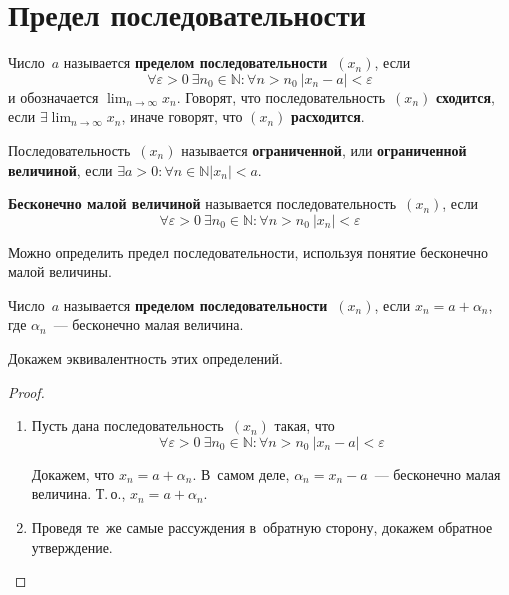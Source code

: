 \section{Предел последовательности}
  Число~$a$ называется \textbf{пределом последовательности~$(x_n)$}, если
\begin{equation*}
\forall \varepsilon > 0 \ \exists n_0 \in \mathbb N \colon \forall n > n_0 \ |x_n - a| < \varepsilon
\end{equation*}
и обозначается $\displaystyle \lim_{n \to \infty} x_n$.
Говорят, что последовательность~$(x_n)$ \textbf{сходится}, если $\displaystyle \exists\lim_{n \to \infty} x_n$, иначе говорят, что $(x_n)$ \textbf{расходится}.

Последовательность~$(x_n)$ называется \textbf{ограниченной}, или \textbf{ограниченной величиной}, если
$\exists a > 0 \colon \forall n \in \mathbb N \allowbreak |x_n| < a$.

 \textbf{Бесконечно малой величиной} называется последовательность~$(x_n)$, если
\begin{equation*}
\forall \varepsilon > 0 \ \exists n_0 \in \mathbb N \colon \forall n > n_0 \ |x_n| < \varepsilon
\end{equation*}

Можно определить предел последовательности, используя понятие бесконечно малой величины.

Число~$a$ называется \textbf{пределом последовательности~$(x_n)$}, если $x_n = a + \alpha_n$, где $\alpha_n$~--- бесконечно малая величина.

Докажем эквивалентность этих определений.
\begin{proof}
\begin{enumerate}
	\item Пусть дана последовательность~$(x_n)$ такая, что
	\begin{equation*}
	\forall \varepsilon > 0 \ \exists n_0 \in \mathbb N \colon \forall n > n_0 \ |x_n - a| < \varepsilon
	\end{equation*}
	
	Докажем, что $x_n = a + \alpha_n$.
	В~самом деле, $\alpha_n = x_n - a$~--- бесконечно малая величина.
	Т.\,о., $x_n = a + \alpha_n$.
	
	\item Проведя те~же самые рассуждения в~обратную сторону, докажем обратное утверждение.
\end{enumerate}
\end{proof}

